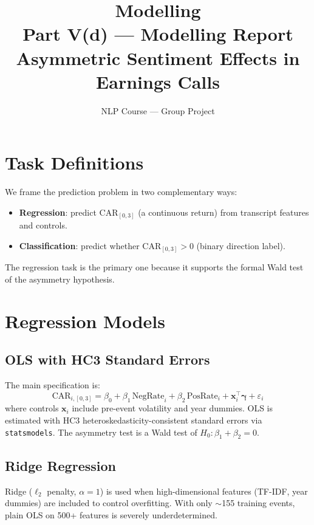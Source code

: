 \documentclass[12pt,a4paper]{article}
\title{\textbf{Modelling}\\[0.3em]
\large Part V(d) --- Modelling Report\\
Asymmetric Sentiment Effects in Earnings Calls}
\author{NLP Course --- Group Project}
\date{}
\begin{document}
\maketitle

\section{Task Definitions}

We frame the prediction problem in two complementary ways:

\begin{itemize}
  \item \textbf{Regression}: predict CAR$_{[0,3]}$ (a continuous return) from
        transcript features and controls.
  \item \textbf{Classification}: predict whether CAR$_{[0,3]} > 0$
        (binary direction label).
\end{itemize}

The regression task is the primary one because it supports the formal Wald test
of the asymmetry hypothesis.

\section{Regression Models}

\subsection{OLS with HC3 Standard Errors}

The main specification is:
\begin{equation}
  \text{CAR}_{i,[0,3]} = \beta_0 + \beta_1 \, \text{NegRate}_i +
  \beta_2 \, \text{PosRate}_i + \mathbf{x}_i^\top \boldsymbol{\gamma} + \varepsilon_i
\end{equation}
where controls $\mathbf{x}_i$ include pre-event volatility and year dummies.
OLS is estimated with HC3 heteroskedasticity-consistent standard errors via
\texttt{statsmodels}.  The asymmetry test is a Wald test of
$H_0: \beta_1 + \beta_2 = 0$.

\subsection{Ridge Regression}

Ridge ($\ell_2$ penalty, $\alpha = 1$) is used when high-dimensional features
(TF-IDF, year dummies) are included to control overfitting.  With only $\sim$155
training events, plain OLS on 500+ features is severely underdetermined.
\end{document}
